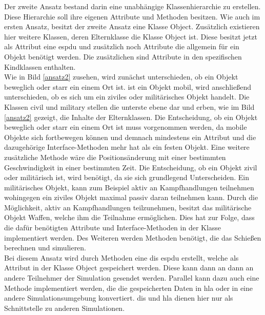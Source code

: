 Der zweite Ansatz bestand darin eine unabhängige Klassenhierarchie zu erstellen. Diese Hierarchie soll ihre eigenen Attribute und Methoden besitzen. Wie auch im ersten Ansatz, besitzt der zweite Ansatz eine Klasse \glqq Object\grqq{}. Zusätzlich existieren hier weitere Klassen, deren Elternklasse die Klasse \glqq Object\grqq{} ist. Diese besitzt jetzt als Attribut eine \ac{espdu} und zusätzlich noch Attribute die allgemein für ein Objekt benötigt werden. Die zusätzlichen sind Attribute  in den spezifischen Kindklassen enthalten. \\  Wie in Bild \ref{ansatz2} zusehen, wird zunächst unterschieden, ob ein Objekt beweglich oder starr ein einem Ort ist. ist ein Objekt mobil, wird anschließend unterschieden, ob es sich um ein ziviles oder militärisches Objekt handelt. Die Klassen \glqq civil\grqq{} und \glqq military\grqq{} stellen die unterste ebene dar und erben, wie im Bild \ref{ansatz2} gezeigt, die Inhalte der Elternklassen. Die Entscheidung, ob ein Objekt beweglich oder starr ein einem Ort ist muss vorgenommen werden, da mobile Objekte sich fortbewegen können und demnach mindestens ein Attribut und die dazugehörige Interface-Methoden mehr hat als ein festen Objekt. Eine weitere zusätzliche Methode wäre die Positionsänderung mit einer bestimmten Geschwindigkeit in einer bestimmten Zeit. Die Entscheidung, ob ein Objekt zivil oder militärisch ist, wird benötigt, da sie sich grundlegend Unterscheiden. Ein militärisches Objekt, kann zum Beispiel aktiv an Kampfhandlungen teilnehmen wohingegen ein ziviles Objekt maximal passiv daran teilnehmen kann. Durch die  Möglichkeit, aktiv an Kampfhandlungen teilzunehmen, besitzt das militärische Objekt Waffen, welche ihm die Teilnahme ermöglichen. Dies hat zur Folge, dass die dafür benötigten Attribute und Interface-Methoden in der Klasse implementiert werden. Des Weiteren werden Methoden benötigt, die das Schießen berechnen und simulieren. \\
Bei diesem Ansatz wird durch Methoden eine \ac{dis} \acl{espdu} erstellt, welche als Attribut in der Klasse \glqq Object\grqq{} gespeichert werden. Diese kann dann an dann an andere Teilnehmer der Simulation gesendet werden. Parallel kann dazu auch eine Methode implementiert werden, die die gespeicherten Daten in \ac{hla} oder in eine andere Simulationsumgebung  konvertiert. \ac{dis} und \ac{hla} dienen hier nur als Schnittstelle zu anderen Simulationen. 
